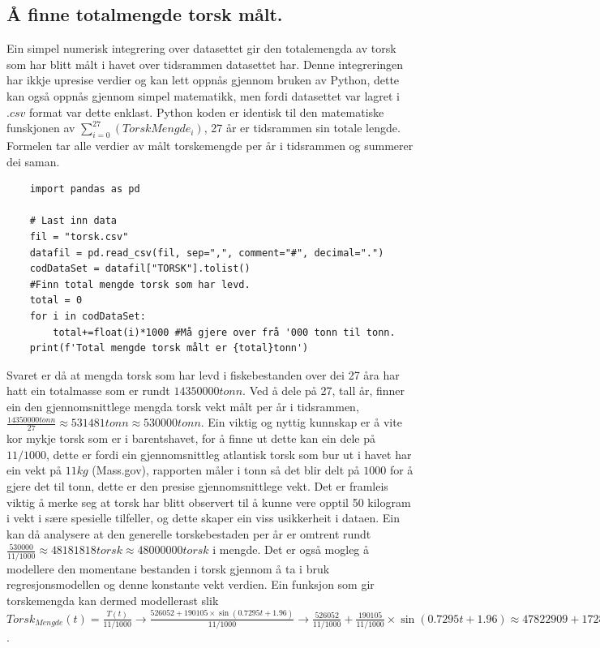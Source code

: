 \documentclass{report}
\begin{document}
\subsection{Å finne totalmengde torsk målt.}
Ein simpel numerisk integrering over datasettet gir den totalemengda av torsk som har blitt målt i havet over tidsrammen datasettet har.
Denne integreringen har ikkje upresise verdier og kan lett oppnås gjennom bruken av Python, dette kan også oppnås gjennom simpel matematikk, men fordi datasettet var lagret i $.csv$ format var dette enklast.
Python koden er identisk til den matematiske funskjonen av $\sum _{i=0} ^{27} (TorskMengde_{i})$, 27 år er tidsrammen sin totale lengde. Formelen tar alle verdier av målt torskemengde per år i tidsrammen og summerer dei saman.
\begin{verbatim}
    import pandas as pd

    # Last inn data
    fil = "torsk.csv"
    datafil = pd.read_csv(fil, sep=",", comment="#", decimal=".")
    codDataSet = datafil["TORSK"].tolist()
    #Finn total mengde torsk som har levd.
    total = 0
    for i in codDataSet:
        total+=float(i)*1000 #Må gjere over frå '000 tonn til tonn.
    print(f'Total mengde torsk målt er {total}tonn')
\end{verbatim}
Svaret er då at mengda torsk som har levd i fiskebestanden over dei 27 åra har hatt ein totalmasse som er rundt $14350000tonn$.
Ved å dele på 27, tall år, finner ein den gjennomsnittlege mengda torsk vekt målt per år i tidsrammen, $\frac{14350000tonn}{27}\approx 531481tonn \approx 530000tonn$.
Ein viktig og nyttig kunnskap er å vite kor mykje torsk som er i barentshavet, for å finne ut dette kan ein dele på $11/1000$, dette er fordi ein gjennomsnittleg atlantisk torsk som bur ut i havet har ein vekt på $11kg$ (Mass.gov), rapporten måler i tonn så det blir delt på $1000$ for å gjere det til tonn, dette er den presise gjennomsnittlege vekt.
Det er framleis viktig å merke seg at torsk har blitt observert til å kunne vere opptil 50 kilogram i vekt i sære spesielle tilfeller, og dette skaper ein viss usikkerheit i dataen.
Ein kan då analysere at den generelle torskebestaden per år er omtrent rundt $\frac{530000}{11/1000}\approx 48181818torsk \approx 48000000torsk$ i mengde.
Det er også mogleg å modellere den momentane bestanden i torsk gjennom å ta i bruk regresjonsmodellen og denne konstante vekt verdien.
Ein funksjon som gir torskemengda kan dermed modellerast slik $Torsk_{Mengde}(t)=\frac{T(t)}{11/1000} \rightarrow\frac{526052+190105\times \sin(0.7295t+1.96)}{11/1000}\rightarrow\frac{526052}{11/1000} + \frac{190105}{11/1000}\times \sin(0.7295t+1.96)\approx 47822909+17282272\times \sin(0.7295t+1.96)$.
\end{document}
